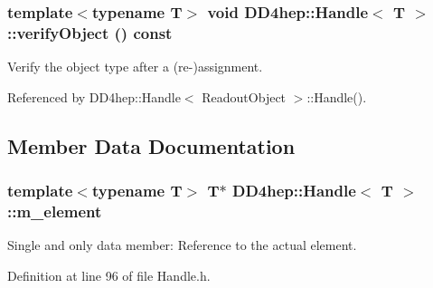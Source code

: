 {\subsubsection[{verifyObject}]{\setlength{\rightskip}{0pt plus 5cm}template$<$typename T$>$ void {\bf DD4hep::Handle}$<$ {\bf T} $>$::verifyObject () const}}
\label{class_d_d4hep_1_1_handle_a664da2f5ac76434379046989853da656}


Verify the object type after a (re-\/)assignment. 

Referenced by DD4hep::Handle$<$ ReadoutObject $>$::Handle().

\subsection{Member Data Documentation}
\hypertarget{class_d_d4hep_1_1_handle_a207411705e86b0f4053357c7a8b5532e}{
\subsubsection[{m\_\-element}]{\setlength{\rightskip}{0pt plus 5cm}template$<$typename T$>$ {\bf T}$\ast$ {\bf DD4hep::Handle}$<$ {\bf T} $>$::{\bf m\_\-element}}}
\label{class_d_d4hep_1_1_handle_a207411705e86b0f4053357c7a8b5532e}


Single and only data member: Reference to the actual element. 

Definition at line 96 of file Handle.h.

